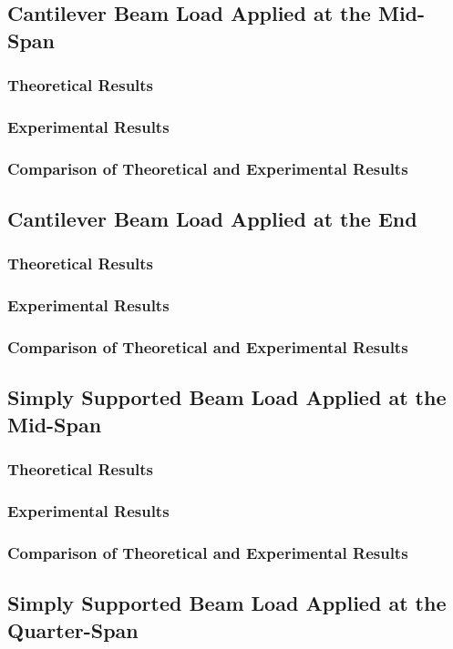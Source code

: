 \documentclass[12pt, titlepage]{article}
\begin{document}
\subsection{Cantilever Beam Load Applied at the Mid-Span}
\subsubsection{Theoretical Results}
\subsubsection{Experimental Results}
\subsubsection{Comparison of Theoretical and Experimental Results}
\subsection{Cantilever Beam Load Applied at the End}
\subsubsection{Theoretical Results}
\subsubsection{Experimental Results}
\subsubsection{Comparison of Theoretical and Experimental Results}
\subsection{Simply Supported Beam Load Applied at the Mid-Span}
\subsubsection{Theoretical Results}
\subsubsection{Experimental Results}
\subsubsection{Comparison of Theoretical and Experimental Results}
\subsection{Simply Supported Beam Load Applied at the Quarter-Span}
\end{document}
